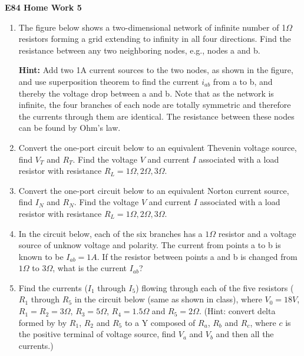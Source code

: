 \usepackage{html}

\begin{center}
{\Large \bf E84 Home Work 5}
\end{center}
\begin{enumerate}

\item The figure below shows a two-dimensional network of infinite number 
of 1$\Omega$ resistors forming a grid extending to infinity in all four 
directions. Find the resistance between any two neighboring nodes, e.g., 
nodes a and b.


{\bf Hint:} Add two 1A current sources to the two nodes, as shown in the 
figure, and use superposition theorem to find the current $i_{ab}$ from 
a to b, and thereby the voltage drop between a and b. Note that as the
network is infinite, the four branches of each node are totally symmetric
and therefore the currents through them are identical. The resistance 
between these nodes can be found by Ohm's law.

\item Convert the one-port circuit below to an equivalent Thevenin voltage
source, find $V_T$ and $R_T$. Find the voltage $V$ and current $I$ associated
with a load resistor with resistance $R_L=1\Omega, 2\Omega, 3\Omega$.


\item Convert the one-port circuit below to an equivalent Norton current
source, find $I_N$ and $R_N$. Find the voltage $V$ and current $I$ associated
with a load resistor with resistance $R_L=1\Omega, 2\Omega, 3\Omega$.


\item In the circuit below, each of the six branches has a $1\Omega$
resistor and a voltage source of unknow voltage and polarity. The current
from points a to b is known to be $I_{ab}=1A$. If the resistor between 
points a and b is changed from $1\Omega$ to $3\Omega$, what is the current
$I_{ab}$?


\item Find the currents ($I_1$ through $I_5$) flowing through each of the 
five resistors ($R_1$ through $R_5$ in the circuit below (same as shown in
class), where $V_0=18V$, $R_1=R_2=3\Omega$, $R_3=5\Omega$, $R_4=1.5\Omega$
and $R_5=2\Omega$. (Hint: convert delta formed by by $R_1$, $R_2$ and $R_5$
to a Y composed of $R_a$, $R_b$ and $R_c$, where $c$ is the positive 
terminal of voltage source, find $V_a$ and $V_b$ and then all the currents.)


\end{enumerate}
